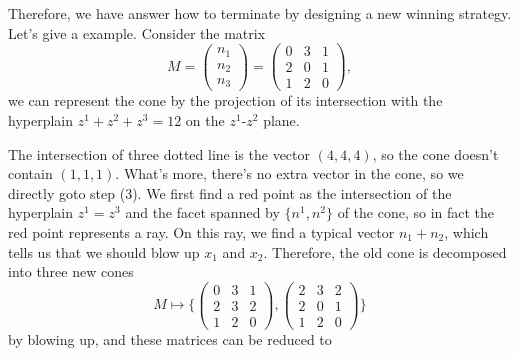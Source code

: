 \documentclass[12pt]{article}
\theoremstyle{definition}
\theoremstyle{plain}
\begin{document}
Therefore, we have answer how to terminate by designing a new winning strategy. 
Let's give a example. Consider the matrix 
\[
M=\left(
\begin{array}{ccc}
 n_1 \\
 n_2 \\
 n_3
\end{array}
\right)
=\left(
\begin{array}{ccc}
 0 & 3 & 1 \\
 2 & 0 & 1 \\
 1 & 2 & 0
\end{array}
\right),
\]
we can represent the cone by the projection of its intersection with the hyperplain $z^1+z^2+z^3=12$
on the $z^1$-$z^2$ plane.
\begin{center}
\end{center}
The intersection of three dotted line is the vector $(4,4,4)$, so the cone doesn't contain
$(1,1,1)$. What's more, there's no extra vector in the cone, so we directly goto step (3).
We first find a red point as the intersection of the hyperplain $z^1=z^3$ and the facet 
spanned by $\{n^1,n^2\}$ of the cone, so in fact the red point represents a ray.
On this ray, we find a typical vector $n_1+n_2$, which tells us that we should blow up 
$x_1$ and $x_2$.
Therefore, the old cone is decomposed into three new cones 
\[
	M\mapsto \biggl\{
	\begin{pmatrix}
		0&3&1\\
		2&3&2\\
		1&2&0
	\end{pmatrix},
	\begin{pmatrix}
		2&3&2\\
		2&0&1\\
		1&2&0
	\end{pmatrix}
\biggr\}
\] 
by blowing up, and these matrices can be reduced to
\end{document}
